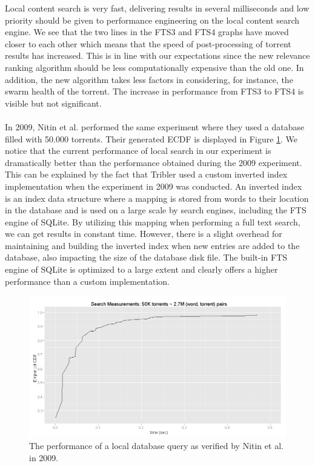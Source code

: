 Local content search is very fast, delivering results in several milliseconds and low priority should be given to performance engineering on the local content search engine. We see that the two lines in the FTS3 and FTS4 graphs have moved closer to each other which means that the speed of post-processing of torrent results has increased. This is in line with our expectations since the new relevance ranking algorithm should be less computationally expensive than the old one. In addition, the new algorithm takes less factors in considering, for instance, the swarm health of the torrent. The increase in performance from FTS3 to FTS4 is visible but not significant.\\\\
In 2009, Nitin et al. performed the same experiment where they used a database filled with 50.000 torrents. Their generated ECDF is displayed in Figure \ref{fig:local-search-nitin}. We notice that the current performance of local search in our experiment is dramatically better than the performance obtained during the 2009 experiment. This can be explained by the fact that Tribler used a custom inverted index implementation when the experiment in 2009 was conducted. An inverted index is an index data structure where a mapping is stored from words to their location in the database and is used on a large scale by search engines, including the FTS engine of SQLite. By utilizing this mapping when performing a full text search, we can get results in constant time. However, there is a slight overhead for maintaining and building the inverted index when new entries are added to the database, also impacting the size of the database disk file. The built-in FTS engine of SQLite is optimized to a large extent and clearly offers a higher performance than a custom implementation.

\begin{figure}[h!]
	\centering
	\includegraphics[width=1.0\columnwidth]{images/experiments/nitin_local_search}
	\caption{The performance of a local database query as verified by Nitin et al. in 2009.}
	\label{fig:local-search-nitin}
\end{figure}

